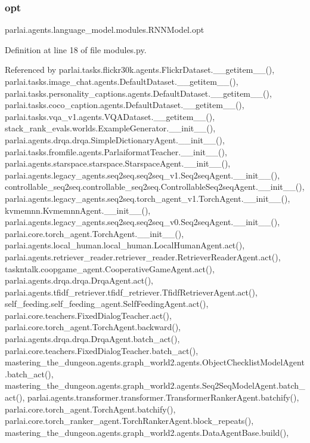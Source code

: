 \subsubsection{\texorpdfstring{opt}{opt}}
{\footnotesize\ttfamily parlai.\+agents.\+language\+\_\+model.\+modules.\+R\+N\+N\+Model.\+opt}



Definition at line 18 of file modules.\+py.



Referenced by parlai.\+tasks.\+flickr30k.\+agents.\+Flickr\+Dataset.\+\_\+\+\_\+getitem\+\_\+\+\_\+(), parlai.\+tasks.\+image\+\_\+chat.\+agents.\+Default\+Dataset.\+\_\+\+\_\+getitem\+\_\+\+\_\+(), parlai.\+tasks.\+personality\+\_\+captions.\+agents.\+Default\+Dataset.\+\_\+\+\_\+getitem\+\_\+\+\_\+(), parlai.\+tasks.\+coco\+\_\+caption.\+agents.\+Default\+Dataset.\+\_\+\+\_\+getitem\+\_\+\+\_\+(), parlai.\+tasks.\+vqa\+\_\+v1.\+agents.\+V\+Q\+A\+Dataset.\+\_\+\+\_\+getitem\+\_\+\+\_\+(), stack\+\_\+rank\+\_\+evals.\+worlds.\+Example\+Generator.\+\_\+\+\_\+init\+\_\+\+\_\+(), parlai.\+agents.\+drqa.\+drqa.\+Simple\+Dictionary\+Agent.\+\_\+\+\_\+init\+\_\+\+\_\+(), parlai.\+tasks.\+fromfile.\+agents.\+Parlaiformat\+Teacher.\+\_\+\+\_\+init\+\_\+\+\_\+(), parlai.\+agents.\+starspace.\+starspace.\+Starspace\+Agent.\+\_\+\+\_\+init\+\_\+\+\_\+(), parlai.\+agents.\+legacy\+\_\+agents.\+seq2seq.\+seq2seq\+\_\+v1.\+Seq2seq\+Agent.\+\_\+\+\_\+init\+\_\+\+\_\+(), controllable\+\_\+seq2seq.\+controllable\+\_\+seq2seq.\+Controllable\+Seq2seq\+Agent.\+\_\+\+\_\+init\+\_\+\+\_\+(), parlai.\+agents.\+legacy\+\_\+agents.\+seq2seq.\+torch\+\_\+agent\+\_\+v1.\+Torch\+Agent.\+\_\+\+\_\+init\+\_\+\+\_\+(), kvmemnn.\+Kvmemnn\+Agent.\+\_\+\+\_\+init\+\_\+\+\_\+(), parlai.\+agents.\+legacy\+\_\+agents.\+seq2seq.\+seq2seq\+\_\+v0.\+Seq2seq\+Agent.\+\_\+\+\_\+init\+\_\+\+\_\+(), parlai.\+core.\+torch\+\_\+agent.\+Torch\+Agent.\+\_\+\+\_\+init\+\_\+\+\_\+(), parlai.\+agents.\+local\+\_\+human.\+local\+\_\+human.\+Local\+Human\+Agent.\+act(), parlai.\+agents.\+retriever\+\_\+reader.\+retriever\+\_\+reader.\+Retriever\+Reader\+Agent.\+act(), taskntalk.\+coopgame\+\_\+agent.\+Cooperative\+Game\+Agent.\+act(), parlai.\+agents.\+drqa.\+drqa.\+Drqa\+Agent.\+act(), parlai.\+agents.\+tfidf\+\_\+retriever.\+tfidf\+\_\+retriever.\+Tfidf\+Retriever\+Agent.\+act(), self\+\_\+feeding.\+self\+\_\+feeding\+\_\+agent.\+Self\+Feeding\+Agent.\+act(), parlai.\+core.\+teachers.\+Fixed\+Dialog\+Teacher.\+act(), parlai.\+core.\+torch\+\_\+agent.\+Torch\+Agent.\+backward(), parlai.\+agents.\+drqa.\+drqa.\+Drqa\+Agent.\+batch\+\_\+act(), parlai.\+core.\+teachers.\+Fixed\+Dialog\+Teacher.\+batch\+\_\+act(), mastering\+\_\+the\+\_\+dungeon.\+agents.\+graph\+\_\+world2.\+agents.\+Object\+Checklist\+Model\+Agent.\+batch\+\_\+act(), mastering\+\_\+the\+\_\+dungeon.\+agents.\+graph\+\_\+world2.\+agents.\+Seq2\+Seq\+Model\+Agent.\+batch\+\_\+act(), parlai.\+agents.\+transformer.\+transformer.\+Transformer\+Ranker\+Agent.\+batchify(), parlai.\+core.\+torch\+\_\+agent.\+Torch\+Agent.\+batchify(), parlai.\+core.\+torch\+\_\+ranker\+\_\+agent.\+Torch\+Ranker\+Agent.\+block\+\_\+repeats(), mastering\+\_\+the\+\_\+dungeon.\+agents.\+graph\+\_\+world2.\+agents.\+Data\+Agent\+Base.\+build(), 